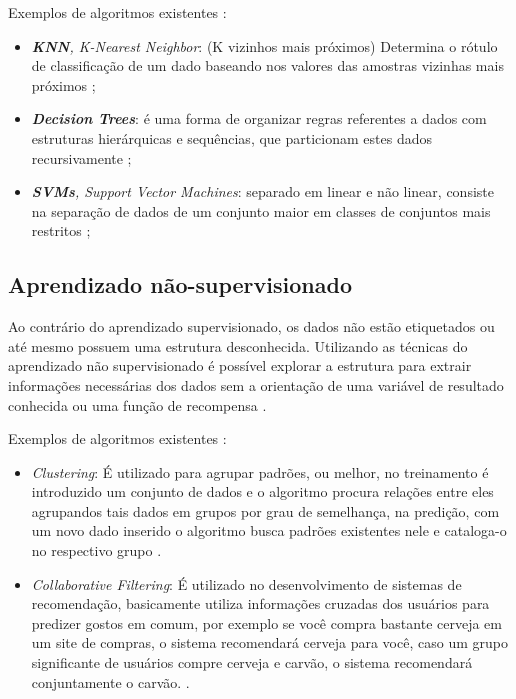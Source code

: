 Exemplos de algoritmos existentes \cite{kirk2014thoughtful}:
\begin{itemize}
    \item \textit{\textbf{KNN}, K-Nearest Neighbor}: (K vizinhos mais próximos) Determina o rótulo de classificação de um dado baseando nos valores das amostras vizinhas mais próximos \cite{kirk2014thoughtful};
    \item \textit{\textbf{Decision Trees}}: é uma forma de organizar regras referentes a dados com estruturas hierárquicas e sequências, que particionam estes dados recursivamente \cite{murthy1998automatic};
    \item \textit{\textbf{SVMs}, Support Vector Machines}: separado em linear e não linear, consiste na separação de dados de um conjunto maior em classes de conjuntos mais restritos \cite{lorena2007introduccao};
\end{itemize}

\subsection{Aprendizado não-supervisionado}
Ao contrário do aprendizado supervisionado, os dados não estão etiquetados ou até mesmo possuem uma estrutura desconhecida. Utilizando as técnicas do aprendizado não supervisionado é possível explorar a estrutura para extrair informações necessárias dos dados sem a orientação de uma variável de resultado conhecida ou uma função de recompensa \cite{geron2017hands} .

Exemplos de algoritmos existentes \cite{kirk2014thoughtful}:
\begin{itemize}
    \item \textit{Clustering}: É utilizado para agrupar padrões, ou melhor, no treinamento é introduzido um conjunto de dados e o algoritmo procura relações entre eles agrupandos tais dados em grupos por grau de semelhança, na predição, com um novo dado inserido o algoritmo busca padrões existentes nele e cataloga-o no respectivo grupo \cite{kirk2014thoughtful}.   
    \item \textit{Collaborative Filtering}: É utilizado no desenvolvimento de sistemas de recomendação, basicamente utiliza informações cruzadas dos usuários para predizer gostos em comum, por exemplo se você compra bastante cerveja em um site de compras, o sistema recomendará cerveja para você, caso um grupo significante de usuários compre cerveja e carvão, o sistema recomendará conjuntamente o carvão. \cite{kirk2014thoughtful}.  
\end{itemize}

